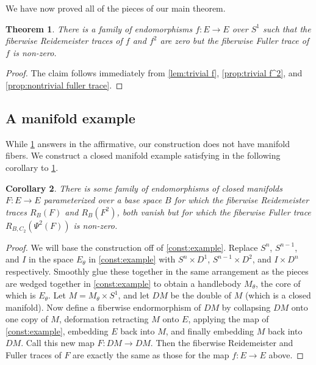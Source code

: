 \documentclass[11pt]{amsart}
\theoremstyle{plain}   %
\newtheorem{thm}{Theorem}[section] %
\newtheorem{cor}[thm]{Corollary}
\theoremstyle{definition}
\theoremstyle{remark}
\numberwithin{equation}{section}
\begin{document}
We have now proved all of the pieces of our main theorem.

\begin{thm}\label{thm:theorem c}
There is a family of endomorphisms $f:E\to E$ over $S^1$ such that the fiberwise Reidemeister traces of $f$ and $f^2$ are zero but the fiberwise Fuller trace of $f$ is non-zero.
\end{thm}

\begin{proof}
The claim follows immediately from \cref{lem:trivial f}, \cref{prop:trivial f^2}, and \cref{prop:nontrivial fuller trace}.
\end{proof}

\subsection{A manifold example}

While \cref{thm:theorem c} answers \cite[Conjecture 1.9]{mp2} in the affirmative, our construction does not have manifold fibers. We construct a closed manifold example satisfying \cite[Conjecture 1.9]{mp2} in the following corollary to \cref{thm:theorem c}. 

\begin{cor}
There is some family of endomorphisms of closed manifolds $F:E\to E$ parameterized over a base space $B$ for which the fiberwise Reidemeister traces $R_B(F)$ and $R_B(F^2)$, both vanish but for which the fiberwise Fuller trace $R_{B,C_2}(\Psi^2(F))$ is non-zero. 
\end{cor}

\begin{proof}
We will base the construction off of \cref{const:example}. Replace $S^n$, $S^{n-1}$, and $I$ in the space $E_\theta$ in \cref{const:example} with $S^n\times D^1$, $S^{n-1}\times D^2$, and $I\times D^n$ respectively. Smoothly glue these together in the same arrangement as the pieces are wedged together in \cref{const:example} to obtain a handlebody $M_\theta$, the core of which is $E_\theta$. Let $M=M_\theta\times S^1$, and let $DM$ be the double of $M$ (which is a closed manifold). Now define a fiberwise endormorphism of $DM$ by collapsing $DM$ onto one copy of $M$, deformation retracting $M$ onto $E$, applying the map of \cref{const:example}, embedding $E$ back into $M$, and finally embedding $M$ back into $DM$. Call this new map $F:DM\to DM$. Then the fiberwise Reidemeister and Fuller traces of $F$ are exactly the same as those for the map $f:E\to E$ above. 
\end{proof}


\end{document}
